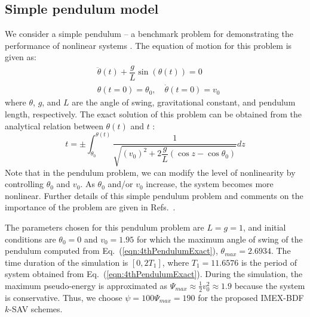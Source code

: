 \documentclass[review]{elsarticle}
\begin{document}
\subsection{Simple pendulum model}
We consider a simple pendulum -- a benchmark problem for demonstrating the performance of nonlinear systems \cite{kim2017new,kim2018improved,fung2001solving}. 
The equation of motion for this problem is given as: 
\begin{align}
    &\ddot{\theta}(t) + \dfrac{g}{L}\sin{(\theta(t))}=0 \\
    &\theta(t=0)=\theta_0, \quad \dot{\theta}(t=0)=v_0
\end{align}
where $\theta$, $g$, and $L$ are the angle of swing, gravitational constant, and pendulum length, respectively.
The exact solution of this problem can be obtained from the analytical relation between $\theta(t)$ and $t$ \cite{fung2001solving}:
\begin{equation}
    t = \pm \int_{\theta_0}^{\theta(t)}\dfrac{1}{\sqrt{\left(v_0\right)^2+2\dfrac{g}{L}(\cos{z}-\cos{\theta_0})}}  dz
    \label{eqn:4thPendulumExact}
\end{equation}
Note that in the pendulum problem, we can modify the level of nonlinearity by controlling $\theta_0$ and $v_0$.
As $\theta_0$ and/or $v_0$ increase, the system becomes more nonlinear.
Further details of this simple pendulum problem and comments on the importance of the problem are given in Refs.~\cite{kim2018improved,fung2001solving}.

The parameters chosen for this pendulum problem are
$L = g = 1$, and initial conditions are $\theta_0=0$ and $v_0=1.95$ for which the maximum angle of swing of the pendulum computed from Eq.~(\ref{eqn:4thPendulumExact}), $\theta_{max}=2.6934$.
The time duration of the simulation is $[0,2T_1]$, where $T_1=11.6576$ is the period of system obtained from Eq.~(\ref{eqn:4thPendulumExact}).
During the simulation, the maximum pseudo-energy is approximated as $\Psi_{max} \approx \frac{1}{2}v_0^2 \approx 1.9$ because the system is conservative.
Thus, we choose $\psi=100\Psi_{max}=190$ for the proposed IMEX-BDF$k$-SAV schemes.
\end{document}
